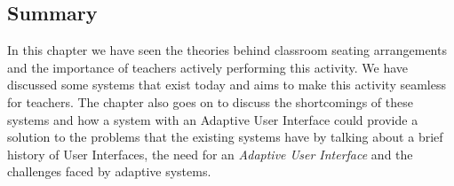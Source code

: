 \subsection{Summary}
In this chapter we have seen the theories behind classroom seating arrangements and the importance of teachers actively performing this activity. We have discussed some systems that exist today and aims to make this activity seamless for teachers. The chapter also goes on to discuss the shortcomings of these systems and how a system with an Adaptive User Interface could provide a solution to the problems that the existing systems have by talking about a brief history of User Interfaces, the need for an \emph{Adaptive User Interface} and the challenges faced by adaptive systems.
